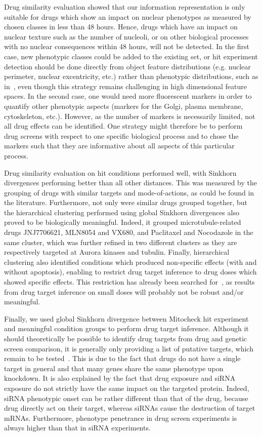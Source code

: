 Drug similarity evaluation showed that our information representation
is only suitable for drugs which show an impact on nuclear phenotypes
as measured by chosen classes in less than 48 hours. Hence, drugs
which have an impact on nuclear texture such as the number of
nucleoli, or on other biological processes with no nuclear
consequences within 48 hours, will not be detected. In the first case,
new phenotypic classes could be added to the existing set, or hit
experiment detection should be done directly from object feature
distributions (e.g. nuclear perimeter, nuclear excentricity, etc.)
rather than phenotypic distributions, such as
in~\cite{pmid18066055}, even though this strategy remains challenging
in high dimensional feature spaces. In the second case, one would need more
fluorescent markers in order to quantify other phenotypic aspects
(markers for the Golgi, plasma membrane, cytoskeleton, etc.). However,
as the number of markers is necessarily limited, not all drug effects
can be identified. One strategy might therefore be to perform drug
screens with respect to one specific biological process and to chose
the markers such that they are informative about all aspects of this
particular process. 

Drug similarity evaluation on hit conditions performed well, with Sinkhorn divergences performing better than all other distances. This was measured by the grouping of drugs with similar targets and mode-of-actions, as could be found in the literature. Furthermore, not only were similar drugs grouped together, but the hierarchical clustering performed using global Sinkhorn divergences also proved to be biologically meaningful. Indeed, it grouped microtubule-related drugs JNJ7706621, MLN8054 and VX680, and Paclitaxel and Nocodazole in the same cluster, which was further refined in two different clusters as they are respectively targeted at Aurora kinases and tubulin. Finally, hierarchical clustering also identified conditions which produced non-specific effects (with and without apoptosis), enabling to restrict drug target inference to drug doses which showed specific effects. This restriction has already been searched for~\cite{pmid17401369}, as results from drug target inference on small doses will probably not be robust and/or meaningful.

Finally, we used global Sinkhorn divergence between Mitocheck hit
experiment and meaningful condition groups to perform drug target
inference. Although it should theoretically be possible to identify
drug targets from drug and genetic screen comparison, it is generally
only providing a list of putative targets, which remain to be
tested~\cite{pmid23508189}. 
This is due to the fact that drugs do not
have a single target in general and that many genes share the same
phenotype upon knockdown. 
It is also explained by the fact that
drug exposure and siRNA exposure do not strictly have the same impact
on the targeted protein. Indeed, siRNA phenotypic onset can be rather
different than that of the drug, because drug directly act on their
target, whereas siRNAs cause the destruction of target
mRNAs. Furthermore, phenotype penetrance in drug screen experiments is
always higher than that in siRNA experiments. 

